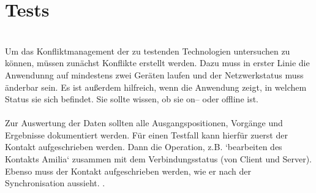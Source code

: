 \section{Tests}
\\
Um das Konfliktmanagement der zu testenden Technologien untersuchen zu können, müssen zunächst Konflikte erstellt werden. Dazu muss in erster Linie die Anwendunng auf mindestens zwei Geräten laufen und der Netzwerkstatus muss änderbar sein. Es ist außerdem hilfreich, wenn die Anwendung zeigt, in welchem Status sie sich befindet. Sie sollte wissen, ob sie on-- oder offline ist.\\
\\
Zur Auswertung der Daten sollten alle Ausgangspositionen, Vorgänge und Ergebnisse dokumentiert werden. Für einen Testfall kann hierfür zuerst der Kontakt aufgeschrieben werden. Dann die Operation, z.B. `bearbeiten des Kontakts Amilia` zusammen mit dem Verbindungsstatus (von Client und Server). Ebenso muss der Kontakt aufgeschrieben werden, wie er nach der Synchronisation aussieht. 
.